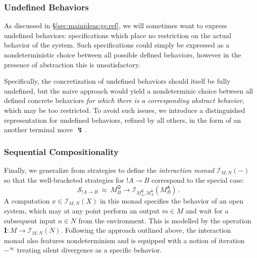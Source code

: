 \documentclass[acmsmall,timestamp,review,anonymous]{acmart}
\newcommand{\kw}[1]{\ensuremath{ \mathsf{#1} }}
\begin{document}

\subsubsection{Undefined Behaviors} %

As discussed in \S\ref{sec:mainideas:gs:ref},
we will sometimes want to express undefined behaviors:
specifications which place no restriction on
the actual behavior of the system.
Such specifications could simply be expressed
as a nondeterministic choice between all possible defined behaviors,
however in the presence of abstraction this is unsatisfactory.

Specifically,
the concretization of undefined behaviors
should itself be fully undefined,
but the naive approach would yield
a nondeterminic choice between all defined concrete behaviors
\emph{for which there is a corresponding abstract behavior},
which may be too restricted.
To avoid such issues,
we introduce a distinguished representation for undefined behaviors,
refined by all others,
in the form of an another terminal move $\lightning$.


\subsubsection{Sequential Compositionality} %

Finally,
we generalize from strategies to
define the \emph{interaction monad} $\mathcal{I}_{M,N}(-)$
so that the well-bracketed strategies for $!A \multimap B$
correspond to the special case:
\[
    \mathcal{S}_{!A \multimap B} \: \approx \:
    M_B^\kw{Q} \rightarrow \mathcal{I}_{M_A^\kw{Q},M_A^\kw{A}}(M_B^\kw{A}) \,.
\]
A computation $x \in \mathcal{I}_{M,N}(X)$ in this monad
specifies the behavior of an open system,
which may at any point perform an output $m \in M$ and
wait for a subsequent input $n \in N$ from the environment.
This is modelled by the operation
$\mathbf{I} : M \rightarrow \mathcal{I}_{M,N}(N)$.
Following the approach outlined above,
the interaction monad also features nondeterminism
and is equipped with a notion of iteration $-^\infty$
treating silent divergence as a specific behavior.
\end{document}
